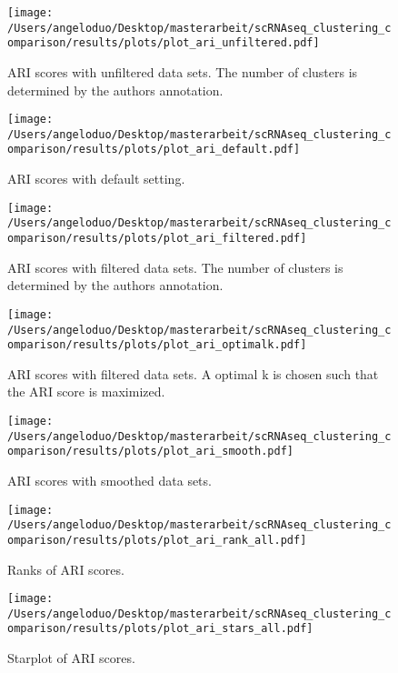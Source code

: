 \documentclass[11pt, a4paper]{article}\usepackage[]{graphicx}\usepackage[]{color}
\begin{document}
\clearpage
\begin{figure}[!h]
\texttt{[image: /Users/angeloduo/Desktop/masterarbeit/scRNAseq\_clustering\_comparison/results/plots/plot\_ari\_unfiltered.pdf]}
\caption{ARI scores with unfiltered data sets. The number of clusters is determined by the authors annotation. }
\label{fig:ariunfilt}
\end{figure}
\begin{figure}[!h]
\texttt{[image: /Users/angeloduo/Desktop/masterarbeit/scRNAseq\_clustering\_comparison/results/plots/plot\_ari\_default.pdf]}
\caption{ARI scores with default setting. }
\label{fig:aridef}
\end{figure}

\begin{figure}[!h]
\texttt{[image: /Users/angeloduo/Desktop/masterarbeit/scRNAseq\_clustering\_comparison/results/plots/plot\_ari\_filtered.pdf]}
\caption{ARI scores with filtered data sets.  The number of clusters is determined by the authors annotation. }
\label{fig:arifilt}
\end{figure}



\begin{figure}[!h]
\texttt{[image: /Users/angeloduo/Desktop/masterarbeit/scRNAseq\_clustering\_comparison/results/plots/plot\_ari\_optimalk.pdf]}
\caption{ARI scores with filtered data sets. A optimal k is chosen such that the ARI score is maximized. }
\label{fig:arifilt}
\end{figure}

\begin{figure}[!h]
\texttt{[image: /Users/angeloduo/Desktop/masterarbeit/scRNAseq\_clustering\_comparison/results/plots/plot\_ari\_smooth.pdf]}
\caption{ARI scores with smoothed data sets.  }
\label{fig:arifilt}
\end{figure}


\begin{figure}[!h]
\texttt{[image: /Users/angeloduo/Desktop/masterarbeit/scRNAseq\_clustering\_comparison/results/plots/plot\_ari\_rank\_all.pdf]}
\caption{Ranks of ARI scores.  }
\label{fig:arirank}
\end{figure}

\begin{figure}[!h]
\texttt{[image: /Users/angeloduo/Desktop/masterarbeit/scRNAseq\_clustering\_comparison/results/plots/plot\_ari\_stars\_all.pdf]}
\caption{Starplot of ARI scores.  }
\label{fig:arirank}
\end{figure}
\end{document}
